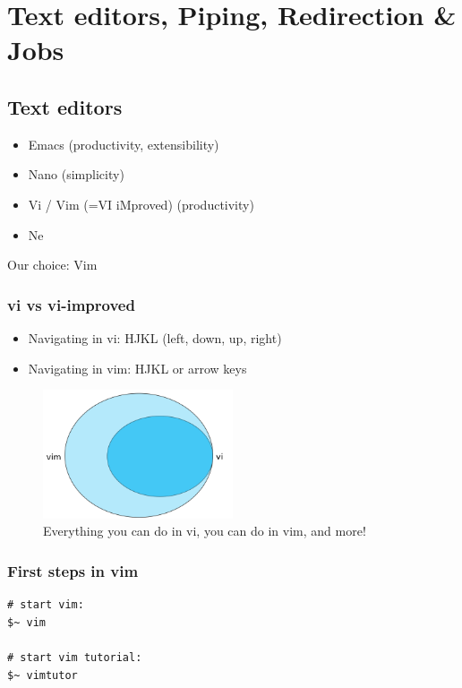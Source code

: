 \documentclass{article}
\begin{document}
\section{Text editors, Piping, Redirection \& Jobs}

\subsection{Text editors}

\begin{itemize}
    \item Emacs (productivity, extensibility)
    \item Nano (simplicity)
    \item Vi / Vim (=VI iMproved) (productivity)
    \item Ne
\end{itemize}

Our choice: Vim

\subsubsection{vi vs vi-improved}

\begin{itemize}
    \item Navigating in vi: HJKL (left, down, up, right)
    \item Navigating in vim: HJKL or arrow keys
\end{itemize}

\begin{figure}[H]
    \centering
    \includegraphics[width=0.5\textwidth]{vi-vim.png}
    \caption{Everything you can do in vi, you can do in vim, and more!}
\end{figure}

\subsubsection{First steps in vim}

\begin{verbatim}
# start vim:
$~ vim

# start vim tutorial:
$~ vimtutor
\end{verbatim}
\end{document}

